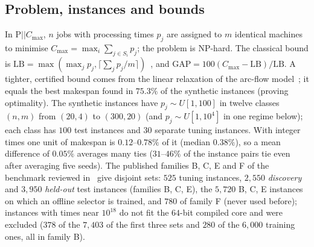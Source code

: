 \documentclass[conference,a4paper]{IEEEtran}
\newcommand{\Cmax}{C_{\max}}
\begin{document}
\subsection{Problem, instances and bounds}
In P$||\Cmax$, $n$ jobs with processing times $p_j$ are assigned to $m$ identical machines to minimise $\Cmax=\max_i\sum_{j\in S_i}p_j$; the problem is NP-hard.
The classical bound is $\mathrm{LB}=\max(\max_jp_j,\lceil\sum_jp_j/m\rceil)$~\cite{Graham1969}, and $\mathrm{GAP}=100(\Cmax-\mathrm{LB})/\mathrm{LB}$. A tighter, certified bound comes from the linear relaxation of the arc-flow
model~\cite{MradSouayah2018}; it equals the best makespan found in $75.3\%$ of the synthetic instances (proving optimality). The synthetic instances have $p_j\sim U[1,100]$ in twelve classes
$(n,m)$ from $(20,4)$ to $(300,20)$ (and $p_j\sim U[1,10^4]$ in one regime below); each class has $100$ test instances and $30$ separate tuning instances. With integer times one unit of makespan is $0.12$--$0.78\%$ of it (median $0.38\%$), so a mean difference of
$0.05\%$ averages many ties ($31$--$46\%$ of the instance pairs tie even after averaging five seeds). The published families B, C, E and F of the benchmark reviewed in~\cite{OstojicEtAl2025} give disjoint sets: $525$ tuning instances, $2{,}550$ \emph{discovery} and $3{,}950$ \emph{held-out}
test instances (families B, C, E), the $5{,}720$ B, C, E instances on which an offline selector is trained, and $780$ of family F (never used before); instances with times near $10^{18}$ do not fit the $64$-bit compiled core and were excluded ($378$ of the $7{,}403$ of the first three sets and $280$ of the $6{,}000$ training ones, all in family B).
\end{document}
